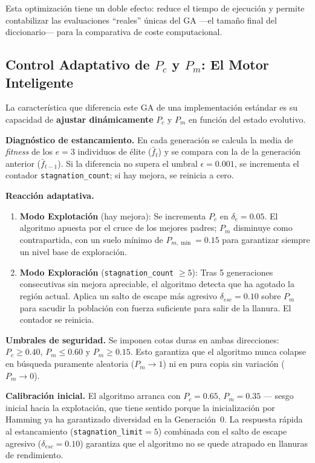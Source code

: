 \documentclass[12pt, a4paper]{article}
\begin{document}
Esta optimización tiene un doble efecto: reduce el tiempo de ejecución y permite
contabilizar las evaluaciones ``reales'' únicas del GA ---el tamaño final del
diccionario--- para la comparativa de coste computacional.

\subsection{Control Adaptativo de \texorpdfstring{$P_c$}{Pc} y \texorpdfstring{$P_m$}{Pm}: El Motor Inteligente}

La característica que diferencia este GA de una implementación estándar es su capacidad
de \textbf{ajustar dinámicamente} $P_c$ y $P_m$ en función del estado evolutivo.

\textbf{Diagnóstico de estancamiento.} En cada generación se calcula la media de
\textit{fitness} de los $e=3$ individuos de élite ($\bar{f}_t$) y se compara con la de
la generación anterior ($\bar{f}_{t-1}$). Si la diferencia no supera el umbral
$\epsilon = 0.001$, se incrementa el contador \texttt{stagnation\_count}; si hay mejora,
se reinicia a cero.

\textbf{Reacción adaptativa.}
\begin{enumerate}[itemsep=0.3em]
  \item \textbf{Modo Explotación} (hay mejora): Se incrementa $P_c$ en $\delta_e = 0.05$.
        El algoritmo apuesta por el cruce de los mejores padres; $P_m$ disminuye como
        contrapartida, con un suelo mínimo de $P_{m,\min} = 0.15$ para garantizar
        siempre un nivel base de exploración.
  \item \textbf{Modo Exploración} (\texttt{stagnation\_count} $\geq 5$): Tras 5
        generaciones consecutivas sin mejora apreciable, el algoritmo detecta que ha
        agotado la región actual. Aplica un salto de escape más agresivo
        $\delta_{esc} = 0.10$ sobre $P_m$ para sacudir la población con fuerza
        suficiente para salir de la llanura. El contador se reinicia.
\end{enumerate}

\textbf{Umbrales de seguridad.} Se imponen cotas duras en ambas direcciones:
$P_c \geq 0.40$, $P_m \leq 0.60$ y $P_m \geq 0.15$. Esto garantiza que el
algoritmo nunca colapse en búsqueda puramente aleatoria ($P_m \to 1$)
ni en pura copia sin variación ($P_m \to 0$).

\textbf{Calibración inicial.} El algoritmo arranca con $P_c=0.65$, $P_m=0.35$
--- sesgo inicial hacia la explotación, que tiene sentido porque la inicialización
por Hamming ya ha garantizado diversidad en la Generación~0. La respuesta rápida
al estancamiento (\texttt{stagnation\_limit}$=5$) combinada con el salto de escape
agresivo ($\delta_{esc}=0.10$) garantiza que el algoritmo no se quede atrapado en
llanuras de rendimiento.
\end{document}
